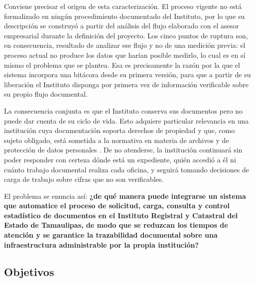 Conviene precisar el origen de esta caracterización. El proceso vigente no está formalizado en ningún procedimiento documentado del Instituto, por lo que su descripción se construyó a partir del análisis del flujo elaborado con el asesor empresarial durante la definición del proyecto. Los cinco puntos de ruptura son, en consecuencia, resultado de analizar ese flujo y no de una medición previa: el proceso actual no produce los datos que harían posible medirlo, lo cual es en sí mismo el problema que se plantea. Esa es precisamente la razón por la que el sistema incorpora una bitácora desde su primera versión, para que a partir de su liberación el Instituto disponga por primera vez de información verificable sobre su propio flujo documental.

La consecuencia conjunta es que el Instituto conserva sus documentos pero no puede dar cuenta de su ciclo de vida. Esto adquiere particular relevancia en una institución cuya documentación soporta derechos de propiedad y que, como sujeto obligado, está sometida a la normativa en materia de archivos \cite{lga2018} y de protección de datos personales \cite{lgpdppso2017}. De no atenderse, la institución continuará sin poder responder con certeza dónde está un expediente, quién accedió a él ni cuánto trabajo documental realiza cada oficina, y seguirá tomando decisiones de carga de trabajo sobre cifras que no son verificables.

El problema se enuncia así: \textbf{¿de qué manera puede integrarse un sistema que automatice el proceso de solicitud, carga, consulta y control estadístico de documentos en el Instituto Registral y Catastral del Estado de Tamaulipas, de modo que se reduzcan los tiempos de atención y se garantice la trazabilidad documental sobre una infraestructura administrable por la propia institución?}

\subsection{Objetivos} \label{sec:objetivos} %

